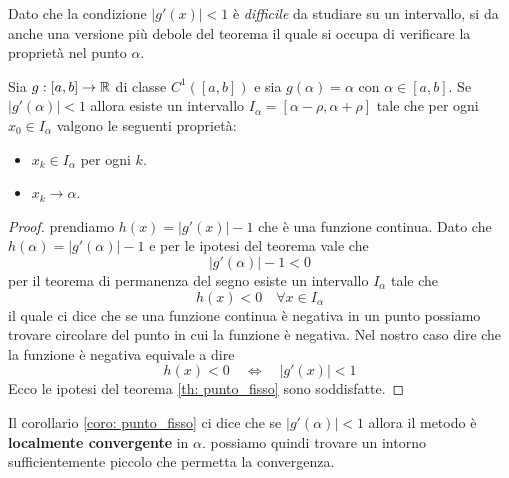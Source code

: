 Dato che la condizione $|g'(x)| < 1$ è \emph{difficile} da studiare su un intervallo, si da anche una versione
più debole del teorema il quale si occupa di verificare la proprietà nel punto $\alpha$.

\begin{corollary}\label{coro: punto_fisso}
	Sia $g : [a, b] \to \mathbb{R}$ di classe $C^1 ([a, b])$ e sia $g(\alpha) = \alpha$ con $\alpha \in [a,b]$. Se
	$|g'(\alpha)| < 1$ allora esiste un intervallo $I_\alpha = [\alpha - \rho, \alpha + \rho]$ tale che per
	ogni $x_0 \in I_\alpha$ valgono le seguenti proprietà:
	\begin{itemize}
		\item $x_k \in I_\alpha$ per ogni $k$.
		\item $x_k \to \alpha$.
	\end{itemize}
	\begin{proof}
		prendiamo $h(x) = |g'(x)| - 1$ che è una funzione continua. Dato che $h(\alpha) = |g'(\alpha)| - 1$ e
		per le ipotesi del teorema vale che
		\[ |g'(\alpha)| - 1 < 0 \]
		per il teorema di permanenza del segno esiste un intervallo $I_\alpha$ tale che
		\[ h(x) < 0 \quad \forall x \in I_\alpha \]
		il quale ci dice che se una funzione continua è negativa in un punto possiamo trovare circolare del punto
		in cui la funzione è negativa. Nel nostro caso dire che la funzione è negativa equivale a dire
		\[ h(x) < 0 \quad \Leftrightarrow \quad |g'(x)| < 1 \]
		Ecco le ipotesi del teorema \ref{th: punto_fisso} sono soddisfatte.
	\end{proof}
\end{corollary}

Il corollario \ref{coro: punto_fisso} ci dice che se $|g'(\alpha)| < 1$ allora il metodo è
\textbf{localmente convergente} in $\alpha$. possiamo quindi trovare un intorno sufficientemente piccolo che
permetta la convergenza.

